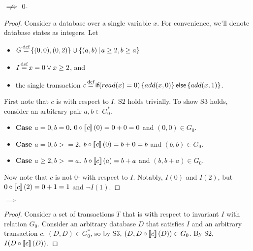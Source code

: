 \begin{claim}\label{clm:istrengthstar-not-implies-0-isafety}
  \istrengthstar $\centernot\implies$ 0-\isafety
\end{claim}
\begin{proof}
  Consider a database over a single variable $x$. For convenience, we'll denote
  database states as integers. Let
  \begin{itemize}
    \item
      $G \defeq \set{(0, 0), (0, 2)} \cup \setst{(a, b)}{a \geq 2, b \geq a}$
    \item
      $I \defeq x = 0 \lor x \geq 2$, and
    \item
      the single \imp{} transaction $c \defeq
      \impif{read(x)=0}{add(x, 0)}{add(x, 1)}$.
  \end{itemize}

  First note that $c$ is \istrengthstar{} with respect to $I$. S2 holds
  trivially. To show S3 holds, consider an arbitrary pair $a, b \in G_0^*$.
  \begin{itemize}
    \item \textbf{Case $a = 0, b = 0$.}
      $0 \circ \left\llbracket c\right\rrbracket(0) = 0 + 0 = 0$ and $(0, 0) \in G_0$.
    \item \textbf{Case $a = 0, b >= 2$.}
      $b \circ \left\llbracket c\right\rrbracket(0) = b + 0 = b$ and $(b, b) \in G_0$.
    \item \textbf{Case $a \geq 2, b >= a$.}
      $b \circ \left\llbracket c\right\rrbracket(a) = b + a$ and $(b, b + a) \in G_0$.
  \end{itemize}

  Now note that $c$ is not 0-\isafe{} with respect to $I$. Notably, $I(0)$ and
  $I(2)$, but $0 \circ \left\llbracket c\right\rrbracket(2) = 0 + 1 = 1$ and $\lnot I(1)$.
\end{proof}

\begin{claim}\label{clm:istrengthstar-implies-ipreservation}
  \istrengthstar $\implies$ \ipreservation
\end{claim}
\begin{proof}
  Consider a set of transactions $T$ that is \istrongstar{} with respect to
  invariant $I$ with relation $G_0$. Consider an arbitrary database $D$ that
  satisfies $I$ and an arbitrary \imp{} transaction $c$. $(D, D) \in G_0^*$,
  so by S3, $(D, D \circ \left\llbracket c\right\rrbracket(D)) \in G_0$. By S2, $I(D \circ \left\llbracket c\right\rrbracket(D))$.
\end{proof}

